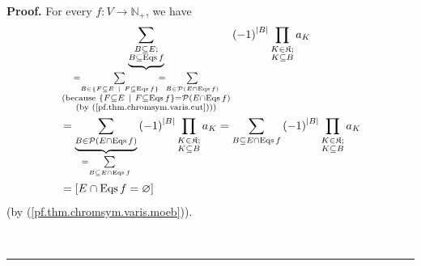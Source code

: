 \documentclass[numbers=enddot,12pt,final,onecolumn,notitlepage]{scrartcl}%
\theoremstyle{definition}
\newenvironment{proof}[1][Proof]{\noindent\textbf{#1.} }{\ \rule{0.5em}{0.5em}}
\newenvironment{verlong}{}{}
\let\sumnonlimits\sum
\let\prodnonlimits\prod
\renewcommand{\sum}{\sumnonlimits\limits}
\renewcommand{\prod}{\prodnonlimits\limits}
\begin{document}
\begin{verlong}
\begin{proof}
For every $f:V\rightarrow\mathbb{N}_{+}$, we have%
\begin{align}
&  \underbrace{\sum_{\substack{B\subseteq E;\\B\subseteq\operatorname*{Eqs}%
f}}}_{\substack{=\sum_{B\in\left\{  F\subseteq E\ \mid\ F\subseteq
\operatorname*{Eqs}f\right\}  }=\sum_{B\in\mathcal{P}\left(  E\cap
\operatorname*{Eqs}f\right)  }\\\text{(because }\left\{  F\subseteq
E\ \mid\ F\subseteq\operatorname*{Eqs}f\right\}  =\mathcal{P}\left(
E\cap\operatorname*{Eqs}f\right)  \\\text{(by (\ref{pf.thm.chromsym.varis.cut}%
)))}}}\left(  -1\right)  ^{\left\vert B\right\vert }\prod_{\substack{K\in
\mathfrak{K};\\K\subseteq B}}a_{K}\nonumber\\
&  =\underbrace{\sum_{B\in\mathcal{P}\left(  E\cap\operatorname*{Eqs}f\right)
}}_{=\sum_{B\subseteq E\cap\operatorname*{Eqs}f}}\left(  -1\right)
^{\left\vert B\right\vert }\prod_{\substack{K\in\mathfrak{K};\\K\subseteq
B}}a_{K}=\sum_{B\subseteq E\cap\operatorname*{Eqs}f}\left(  -1\right)
^{\left\vert B\right\vert }\prod_{\substack{K\in\mathfrak{K};\\K\subseteq
B}}a_{K}\nonumber\\
&  =\left[  E\cap\operatorname*{Eqs}f=\varnothing\right]
\label{pf.thm.chromsym.varis.moeb2}%
\end{align}
(by (\ref{pf.thm.chromsym.varis.moeb})).


\end{proof}
\end{verlong}
\end{document}

